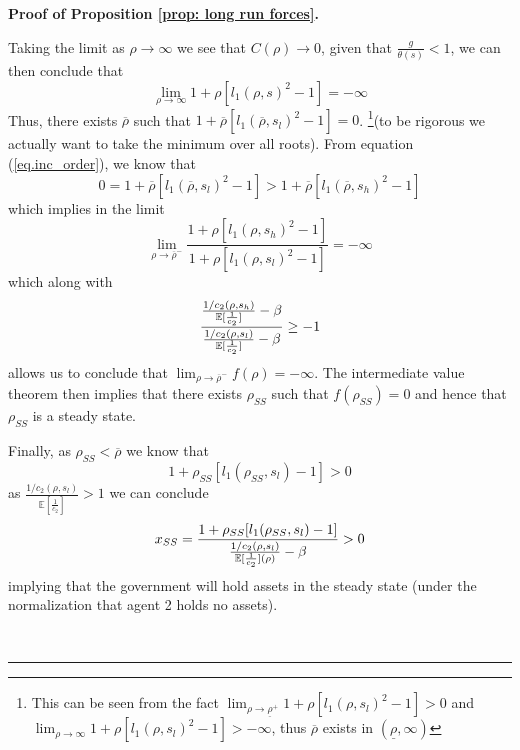 \documentclass[thmsb,11pt]{article}
\newenvironment{proof}[1][Proof]{\noindent \textbf{#1.} }{\  \rule{0.5em}{0.5em}}
\begin{document}
\begin{proof}[Proof of Proposition \ref{prop: long run forces}]
\begin{description}
Taking the limit as $\rho\rightarrow\infty$ we see that $C(\rho)\rightarrow
0 $, given that $\frac g{\theta(s)} <1$, we can then conclude that
\begin{equation*}
\lim_{\rho\rightarrow\infty } 1+ \rho[l_1(\rho,s)^2-1] = -\infty
\end{equation*}
Thus, there exists $\overline \rho$ such that $1+\overline \rho[%
l_1(\overline \rho,s_l)^2-1] = 0$. \footnote{This can be seen from the fact $\lim_{\rho\rightarrow \underline
\rho^+} 1+\rho[l_1(\rho,s_l)^2 -1] > 0$ and $\lim_{\rho\rightarrow \infty } 1+\rho[l_1(\rho,s_l)^2 -1] > -\infty$, thus $\overline{\rho}$ exists in $(\underline{\rho},\infty)$ }(to be rigorous we actually want to
take the minimum over all roots). From equation (\ref{eq.inc_order}), we
know that
\begin{equation*}
0 = 1+\overline \rho[l_1(\overline \rho,s_l)^2-1] > 1+\overline \rho[%
l_1(\overline \rho,s_h)^2-1]
\end{equation*}
which implies in the limit
\begin{equation*}
\lim_{\rho\rightarrow \overline \rho^-}\frac{1+\rho[l_1(\rho,s_h)^2-1]}{1+%
\rho[l_1(\rho,s_l)^2-1]} = -\infty
\end{equation*}
which along with
\begin{equation*}
\frac{\frac{1/c_2(\rho,s_h)}{\mathbb{E}[\frac1{c_2}]}-\beta }{\frac{%
1/c_2(\rho,s_l)}{\mathbb{E}[\frac1{c_2}]}-\beta} \geq -1
\end{equation*}
allows us to conclude that $\lim_{\rho\rightarrow \overline \rho^-} f(\rho)
= -\infty$. The intermediate value theorem then implies that there exists $%
\rho_{SS}$ such that $f(\rho_{SS}) = 0$ and hence that $\rho_{SS}$ is a
steady state.

Finally, as $\rho_{SS} < \overline \rho$ we know that
\begin{equation*}
1+\rho_{SS}[l_1(\rho_{SS},s_l)-1] >0
\end{equation*}%
as $\frac{1/c_2(\rho,s_l)}{\mathbb{E}[\frac1{c_2}]} >1$ we can
conclude
\begin{equation*}
x_{SS} = \frac{1+\rho_{SS}[l_1(\rho_{SS},s_l)-1]}{\frac{1/c_2(\rho,s_l)}{%
\mathbb{E}[\frac1{c_2}](\rho)}-\beta} >0
\end{equation*}%
implying that the government will hold assets in the steady state (under the
normalization that agent 2 holds no assets).


\end{description}
\end{proof}
\end{document}
